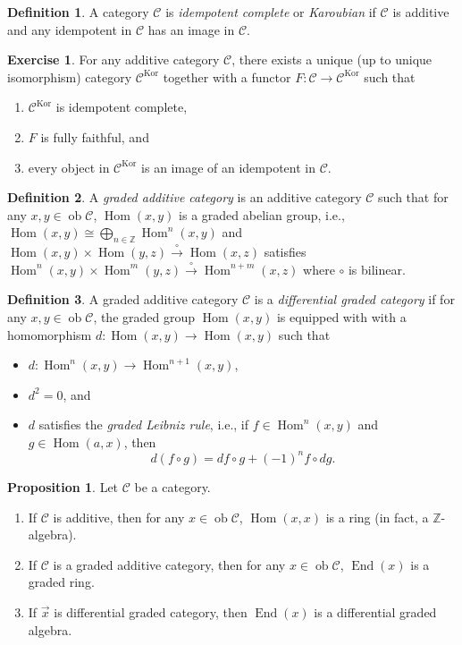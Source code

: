\documentclass[10pt,letterpaper,cm]{nupset}
\theoremstyle{definition}
\newtheorem*{definition}{Definition}
\newtheorem{prop}{Proposition}
\newtheorem{exercise}{Exercise}
\newcommand{\Z}{\mathbb Z}
\newcommand{\1}{\mathbf{1}}
\renewcommand{\c}{\mathscr{C}}
\newcommand{\x}{\vec x}
\newcommand{\0}{\vec 0}
\DeclareMathOperator{\ed}{End}
\DeclareMathOperator{\ob}{ob}
\DeclareMathOperator{\Hom}{Hom}
\DeclareMathOperator{\kor}{Kor}
\begin{document}
\begin{definition}
A category $\c$ is \textit{idempotent complete} or \textit{Karoubian} if $\c$ is additive and any idempotent in $\c$ has an image in $\c$.
\end{definition}

\begin{exercise}
For any additive category $\c$, there exists a unique (up to unique isomorphism) category $\c^{\kor}$ together with a functor $F : \c \to \c^{\kor}$ such that 
\begin{enumerate}
\item $\c^{\kor}$ is idempotent complete,
\item $F$ is fully faithful, and
\item every object in $\c^{\kor}$  is an image of an idempotent in $\c$.
\end{enumerate}
\end{exercise}

\begin{definition}
A \textit{graded additive category} is an additive category $\c$ such that for any $x,y \in \ob{\c}$, $\Hom(x,y)$ is a graded abelian group, i.e., $\Hom(x,y) \cong \bigoplus_{n \in \Z} \Hom^n(x,y)$ and $\Hom(x,y) \times \Hom(y,z) \overset{\circ}{\longrightarrow} \Hom(x,z)$ satisfies $\Hom^n(x,y) \times \Hom^m(y,z) \overset{\circ}{\longrightarrow} \Hom^{n+m}(x,z)$ where $\circ$ is bilinear. 
\end{definition}

\begin{definition}
A graded additive category $\c$ is a \textit{differential graded category} if for any $x,y \in \ob{\c}$, the graded group $\Hom(x,y)$ is equipped with with a homomorphism $d : \Hom(x,y) \to \Hom(x,y)$ such that
\begin{itemize}
\item $d : \Hom^n(x,y) \to \Hom^{n+1}(x,y)$,
\item $d^2 =0$, and
\item $d$ satisfies the \textit{graded Leibniz rule}, i.e., if $f \in \Hom^n(x,y)$ and $g \in \Hom(a,x)$, then $$  d(f\circ g) = df\circ g +({-}1)^nf \circ dg  .$$
\end{itemize}
\end{definition}

\begin{prop} Let $\c$ be a category.
\begin{enumerate}
\item If $\c$ is additive, then for any $x\in \ob{\c}$, $\Hom(x,x)$ is a ring (in fact, a $\Z$-algebra).
\item If $\c$ is a graded additive category, then for any $x\in \ob{\c}$, $\ed(x)$ is a graded ring.
\item If $\x$ is differential graded category, then $\ed(x)$ is a differential graded algebra.
\end{enumerate}
\end{prop}
\end{document}
